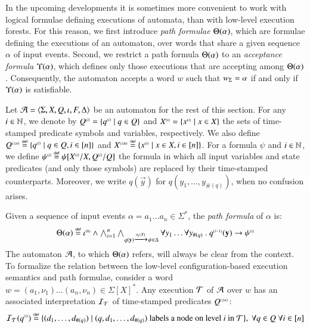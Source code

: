 In the upcoming developments it is sometimes more convenient to work
with logical formulae defining executions of automata, than with
low-level execution forests. For this reason, we first introduce
\emph{path formulae} $\Theta({\alpha})$, which are formulae defining
the executions of an automaton, over words that share a given sequence
$\alpha$ of input events. Second, we restrict a path formula
$\Theta({\alpha})$ to an \emph{acceptance formula}
$\Upsilon({\alpha})$, which defines only those executions that are
accepting among $\Theta({\alpha})$. Consequently, the automaton
accepts a word $w$ such that ${w}_\Sigma = \alpha$ if and only if
$\Upsilon({\alpha})$ is satisfiable.

Let $\mathcal{A} = \langle \Sigma,X,Q,\iota,F,\Delta \rangle$ be an automaton for the
rest of this section. For any $i \in {\bf \mathbb{N}}$, we denote by ${Q}^{\scriptscriptstyle{({i})}}
= \{ {q}^{\scriptscriptstyle{({i})}} \mid q \in Q \}$ and ${X}^{\scriptscriptstyle{({i})}} =
\{ {x}^{\scriptscriptstyle{({i})}} \mid x \in X \}$ the sets of time-stamped predicate
symbols and variables, respectively. We also define ${Q}^{\scriptscriptstyle{({\leq n})}}
\stackrel{\scriptscriptstyle{\mathsf{def}}}{=} \{ {q}^{\scriptscriptstyle{({i})}} \mid q \in Q, i \in [n] \}$ and ${X}^{\scriptscriptstyle{({\leq
  n})}} \stackrel{\scriptscriptstyle{\mathsf{def}}}{=} \{ {x}^{\scriptscriptstyle{({i})}} \mid x \in X, i \in [n] \}$. For a formula
$\psi$ and $i \in {\bf \mathbb{N}}$, we define ${\psi}^{\scriptscriptstyle{({i})}} \stackrel{\scriptscriptstyle{\mathsf{def}}}{=}
\psi[{X}^{\scriptscriptstyle{({i})}}/X,{Q}^{\scriptscriptstyle{({i})}}/Q]$ the formula in which all input
variables and state predicates (and only those symbols) are replaced
by their time-stamped counterparts. Moreover, we write $q(\vec{y})$
for $q(y_1,\ldots,y_{\#(q)})$, when no confusion arises.

Given a sequence of input events $\alpha = a_1 \ldots a_n \in
\Sigma^*$, the \emph{path formula} of $\alpha$ is:
\begin{equation}\label{eq:pathform}
\begin{array}{c}
\Theta({\alpha}) \stackrel{\scriptscriptstyle{\mathsf{def}}}{=} {\iota}^{\scriptscriptstyle{({0})}} \wedge 
\bigwedge_{i=1}^n \bigwedge_{q(\mathbf y) \xrightarrow{{\scriptscriptstyle a_i(X)}}_{{\scriptstyle }}
  \psi \in \Delta} \forall y_1 \ldots \forall y_{\#(q)} ~.~
{q}^{\scriptscriptstyle{({i-1})}}(\mathbf y) \rightarrow {\psi}^{\scriptscriptstyle{({i})}}
\end{array}
\end{equation}
The automaton $\mathcal{A}$, to which $\Theta({\alpha})$ refers, will always
be clear from the context. To formalize the relation between the
low-level configuration-based execution semantics and path formulae,
consider a word $w=(a_1,\nu_1) \ldots (a_n,\nu_n) \in
\Sigma[X]^*$. Any execution $\mathcal{T}$ of $\mathcal{A}$ over $w$ has an associated
interpretation $\mathcal{I}_{\mathcal{T}}$ of time-stamped predicates ${Q}^{\scriptscriptstyle{({\leq
  n})}}$:
\[\mathcal{I}_{\mathcal{T}}({q}^{\scriptscriptstyle{({i})}}) \stackrel{\scriptscriptstyle{\mathsf{def}}}{=} \{ (d_1,\ldots,d_{\#(q)}) \mid
  (q,d_1,\ldots,d_{\#(q)}) \text{ labels a node on level $i$ in $\mathcal{T}$} \}
,~\forall q\in Q ~\forall i \in [n]\]

